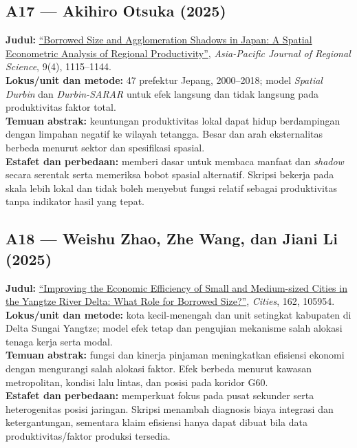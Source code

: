 \documentclass[
  indonesian,
  11pt,
  a4paper,
  oneside,
  openany]{report}
\begin{document}
\subsection{A17 --- Akihiro Otsuka
(2025)}\label{a17-akihiro-otsuka-2025}

\textbf{Judul:}
\href{https://doi.org/10.1007/s41685-025-00398-2}{``Borrowed Size and
Agglomeration Shadows in Japan: A Spatial Econometric Analysis of
Regional Productivity''}, \emph{Asia-Pacific Journal of Regional
Science}, 9(4), 1115--1144.\\
\textbf{Lokus/unit dan metode:} 47 prefektur Jepang, 2000--2018; model
\emph{Spatial Durbin} dan \emph{Durbin-SARAR} untuk efek langsung dan
tidak langsung pada produktivitas faktor total.\\
\textbf{Temuan abstrak:} keuntungan produktivitas lokal dapat hidup
berdampingan dengan limpahan negatif ke wilayah tetangga. Besar dan arah
eksternalitas berbeda menurut sektor dan spesifikasi spasial.\\
\textbf{Estafet dan perbedaan:} memberi dasar untuk membaca manfaat dan
\emph{shadow} secara serentak serta memeriksa bobot spasial alternatif.
Skripsi bekerja pada skala lebih lokal dan tidak boleh menyebut fungsi
relatif sebagai produktivitas tanpa indikator hasil yang tepat.

\subsection{A18 --- Weishu Zhao, Zhe Wang, dan Jiani Li
(2025)}\label{a18-weishu-zhao-zhe-wang-dan-jiani-li-2025}

\textbf{Judul:}
\href{https://doi.org/10.1016/j.cities.2025.105954}{``Improving the
Economic Efficiency of Small and Medium-sized Cities in the Yangtze
River Delta: What Role for Borrowed Size?''}, \emph{Cities}, 162,
105954.\\
\textbf{Lokus/unit dan metode:} kota kecil-menengah dan unit setingkat
kabupaten di Delta Sungai Yangtze; model efek tetap dan pengujian
mekanisme salah alokasi tenaga kerja serta modal.\\
\textbf{Temuan abstrak:} fungsi dan kinerja pinjaman meningkatkan
efisiensi ekonomi dengan mengurangi salah alokasi faktor. Efek berbeda
menurut kawasan metropolitan, kondisi lalu lintas, dan posisi pada
koridor G60.\\
\textbf{Estafet dan perbedaan:} memperkuat fokus pada pusat sekunder
serta heterogenitas posisi jaringan. Skripsi menambah diagnosis biaya
integrasi dan ketergantungan, sementara klaim efisiensi hanya dapat
dibuat bila data produktivitas/faktor produksi tersedia.
\end{document}
